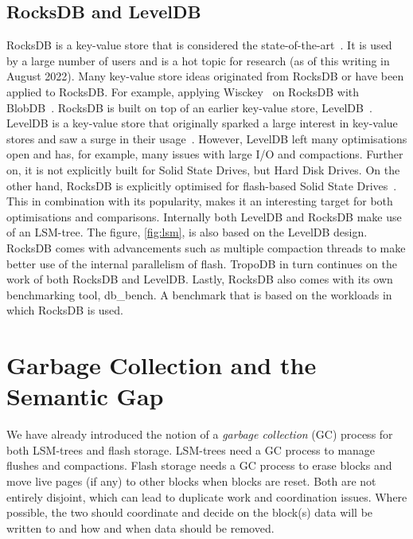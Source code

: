 \subsection{RocksDB and LevelDB}
\label{sec:rocks}
RocksDB is a key-value store that is considered the state-of-the-art~\cite{RocksDB, doekemeijer2022key}. It is used by a large number of users and is a hot topic for research (as of this writing in August 2022). Many key-value store ideas originated from RocksDB or have been applied to RocksDB. For example, applying Wisckey~\cite{lu2017wisckey} on RocksDB with BlobDB~\cite{dong2021evolution}.  RocksDB is built on top of an earlier key-value store, LevelDB~\cite{LevelDB, ghemawat2011leveldb}. LevelDB is a key-value store that originally sparked a large interest in key-value stores and saw a surge in their usage~\cite{doekemeijer2022key}. However, LevelDB left many optimisations open and has, for example, many issues with large I/O and compactions. Further on, it is not explicitly built for Solid State Drives, but Hard Disk Drives. On the other hand, RocksDB is explicitly optimised for flash-based Solid State Drives~\cite{dong2021evolution}. This in combination with its popularity, makes it an interesting target for both optimisations and comparisons. Internally both LevelDB and RocksDB make use of an LSM-tree. The figure, \autoref{fig:lsm}, is also based on the LevelDB design. RocksDB comes with advancements such as multiple compaction threads to make better use of the internal parallelism of flash. TropoDB in turn continues on the work of both RocksDB and LevelDB. Lastly, RocksDB also comes with its own benchmarking tool, db\_bench. A benchmark that is based on the workloads in which RocksDB is used.  

\section{Garbage Collection and the Semantic Gap}
\label{sec:backgroundsemantic}
We have already introduced the notion of a \textit{garbage collection} (GC) process for both LSM-trees and flash storage.  LSM-trees need a GC process to manage flushes and compactions. Flash storage needs a GC process to erase blocks and move live pages (if any) to other blocks when blocks are reset. Both are not entirely disjoint, which can lead to duplicate work and coordination issues. Where possible, the two should coordinate and decide on the block(s) data will be written to and how and when data should be removed.

